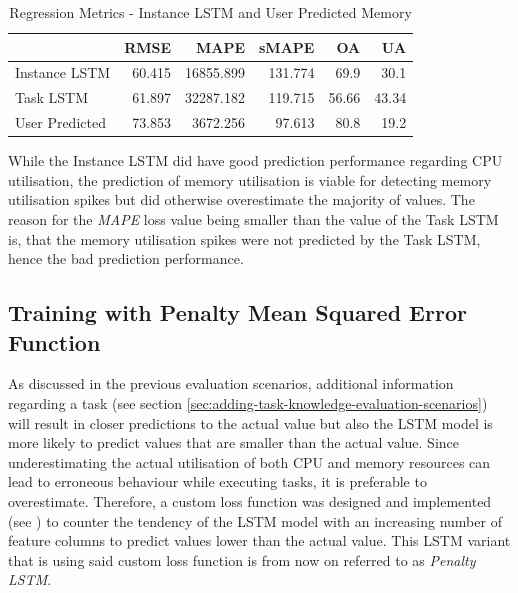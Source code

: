       \begin{table}
        \centering
        \caption{Regression Metrics - Instance LSTM and User Predicted Memory}
        \label{tab:regression-metrics-instance-lstm-user-predicted-memory}

        \begin{tabular}{|l|rrrrr|}
          \toprule
          {} &    RMSE &       MAPE &    sMAPE &    OA &    UA \\
          \midrule
          Instance LSTM   &  60.415 &  16855.899 &  131.774 &  69.9 &  30.1 \\
          Task LSTM   &  61.897 &  32287.182 &  119.715 &  56.66 &  43.34 \\
          User Predicted &  73.853 &   3672.256 &   97.613 &  80.8 &  19.2 \\
          \bottomrule
          \end{tabular}
      \end{table}
      While the Instance LSTM did have good prediction performance regarding CPU utilisation, the prediction of memory utilisation is viable for detecting memory utilisation spikes but did otherwise overestimate the majority of values.
      The reason for the \emph{MAPE} loss value being smaller than the value of the Task LSTM is, that the memory utilisation spikes were not predicted by the Task LSTM, hence the bad prediction performance.

  \subsection{Training with Penalty Mean Squared Error Function}
  \label{sec:training-with-custom-loss-function-evaluation-scenarios}

      As discussed in the previous evaluation scenarios, 
      additional information regarding a task (see section \ref{sec:adding-task-knowledge-evaluation-scenarios}) will result in closer predictions to the actual value but also the LSTM model is more likely to predict values that are smaller than the actual value.
      Since underestimating the actual utilisation of both CPU and memory resources can lead to erroneous behaviour while executing tasks, it is preferable to overestimate.
      Therefore, a custom loss function was designed and implemented (see ) to counter the tendency of the LSTM model with an increasing number of feature columns to predict values lower than the actual value.
      This LSTM variant that is using said custom loss function is from now on referred to as \emph{Penalty LSTM}.


